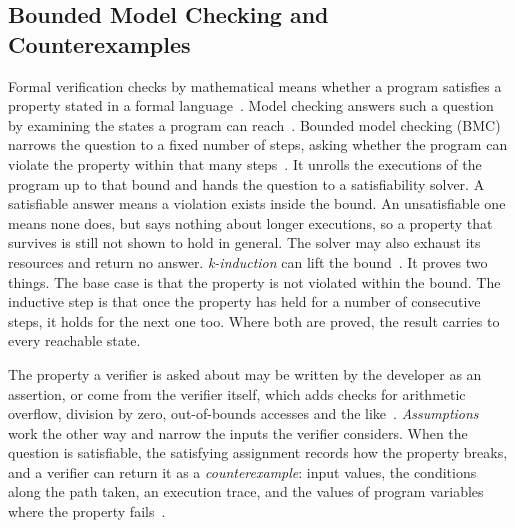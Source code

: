 \documentclass[manuscript,anonymous]{acmart}
\begin{document}


\subsection{Bounded Model Checking and Counterexamples}

Formal verification checks by mathematical means whether a program satisfies a
property stated in a formal language~\cite{BaierKatoen2008}. Model checking
answers such a question by examining the states a program can
reach~\cite{Clarke1999ModelChecking}. Bounded model checking (BMC) narrows the
question to a fixed number of steps, asking whether the program can violate the
property within that many steps~\cite{Biere1999}. It unrolls the executions of
the program up to that bound and hands the question to a satisfiability solver.
A satisfiable answer means a violation exists inside the bound. An
unsatisfiable one means none does, but says nothing about longer executions, so
a property that survives is still not shown to hold in general. The solver may
also exhaust its resources and return no answer. \emph{k-induction} can lift
the bound~\cite{gadelha2017kinduction}. It proves two things. The base case is
that the property is not violated within the bound. The inductive step is that
once the property has held for a number of consecutive steps, it holds for the
next one too. Where both are proved, the result carries to every reachable
state.

The property a verifier is asked about may be written by the developer as an
assertion, or come from the verifier itself, which adds checks for arithmetic
overflow, division by zero, out-of-bounds accesses and the like~\cite{smtchecker}.
\emph{Assumptions} work the other way and narrow the inputs the verifier
considers. When the question is satisfiable, the satisfying assignment records
how the property breaks, and a verifier can return it as a
\emph{counterexample}: input values, the conditions along the path taken, an
execution trace, and the values of program variables where the property
fails~\cite{counterexample}.
\end{document}
